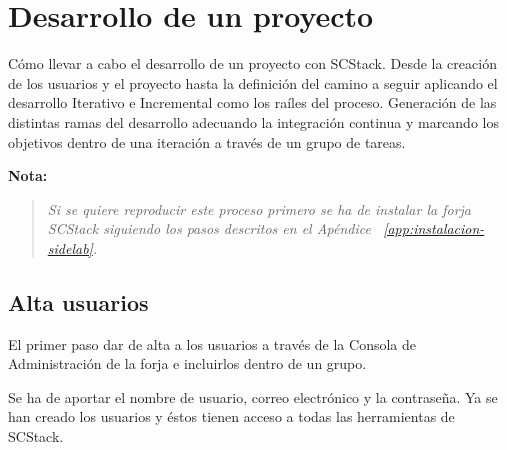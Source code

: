 %
% 

\chapter{Desarrollo de un proyecto}
\label{chap:desarrollo}

\par Cómo llevar a cabo el desarrollo de un proyecto con SCStack. Desde la creación de los usuarios y el proyecto hasta la definición del camino a seguir aplicando el desarrollo Iterativo e Incremental como los raíles del proceso. Generación de las distintas ramas del desarrollo adecuando la integración continua y marcando los objetivos dentro de una iteración a través de un grupo de tareas.

\par \textbf{Nota:}

\begin{quote}
    \emph{Si se quiere reproducir este proceso primero se ha de instalar la forja SCStack siguiendo los pasos descritos en el Apéndice ~\ref{app:instalacion-sidelab}.}
\end{quote}

\begin{comment}
Desarrollo en paralelo de un proyecto mediante github + travis-ci vs gerrit + jenkins.
\end{comment}

\section{Alta usuarios}
\label{sec:alta-usuarios}

\par El primer paso dar de alta a los usuarios a través de la Consola de Administración de la forja e incluirlos dentro de un grupo.

\par Se ha de aportar el nombre de usuario, correo electrónico y la contraseña. Ya se han creado los usuarios y éstos tienen acceso a todas las herramientas de SCStack.

